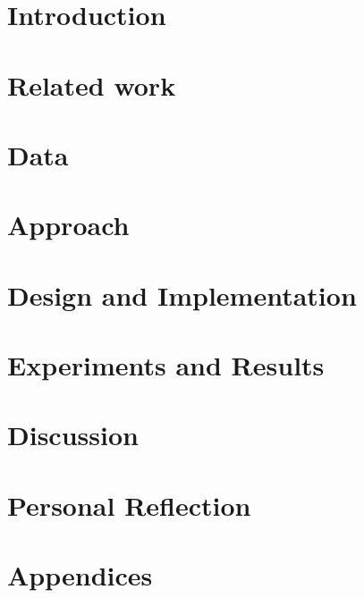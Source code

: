 \documentclass[12pt,twoside]{report}
\begin{document}




% 

\tableofcontents

\listoffigures



\chapter{Introduction}


\chapter{Related work}


\chapter{Data}


\chapter{Approach}


\chapter{Design and Implementation}


\chapter{Experiments and Results}


\chapter{Discussion}





\appendix
\chapter{Personal Reflection }

\chapter{Appendices}

% 

\printbibliography
\end{document}
